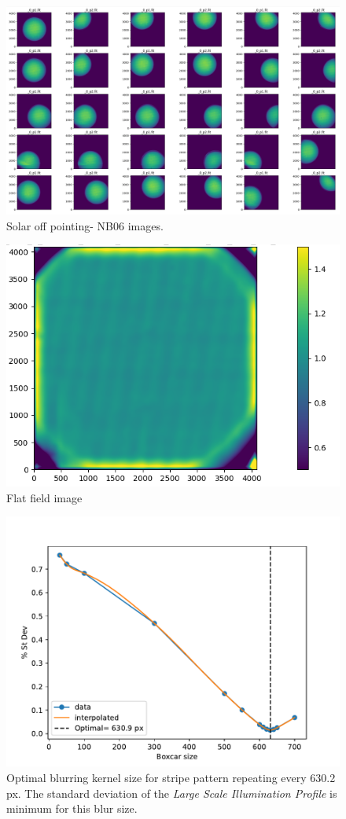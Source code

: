 \documentclass[11pt,a4paper]{article}
\begin{document}
	\begin{figure}
		\centering
		\includegraphics[width=0.7\linewidth]{pics/screenshot_2024-06-06_11-35-10.png}
		\caption{Solar off pointing- NB06 images.}
		\label{fig:off pointing}
	\end{figure}
	
	\begin{figure}
		\centering
		\includegraphics[width=0.5\linewidth]{pics/screenshot_2024-06-17_12-30-11.png}
		\caption{Flat field image}
		\label{fig:flat_field}
	\end{figure}
	
	\begin{figure}
		\centering
		\includegraphics[width=0.7\linewidth]{pics/13.pdf}
		\caption{Optimal blurring kernel size for stripe pattern repeating every 630.2 px. The standard deviation of the  \textit{Large Scale Illumination Profile} is minimum for this blur size.}
		\label{fig:optimal}
	\end{figure}
	
\end{document}
